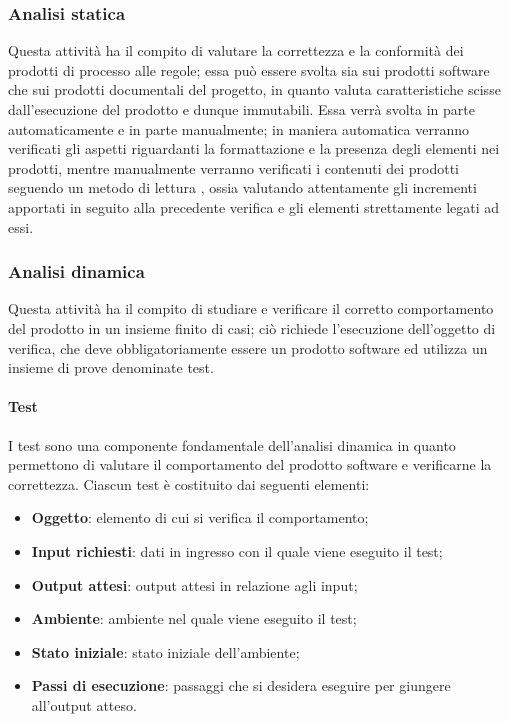 \subsubsection{Analisi statica}
\label{ssub:verifica:analisi_statica}

Questa attività ha il compito di valutare la correttezza e la conformità dei prodotti di processo alle regole; essa può essere svolta sia 
sui prodotti software che sui prodotti documentali del progetto, in quanto valuta caratteristiche scisse dall'esecuzione del prodotto e 
dunque immutabili. Essa verrà svolta in parte automaticamente e in parte manualmente; in maniera automatica verranno verificati gli 
aspetti riguardanti la formattazione e la presenza degli elementi nei prodotti, mentre manualmente verranno verificati i contenuti dei 
prodotti seguendo un metodo di lettura , ossia valutando attentamente gli incrementi apportati in seguito alla 
precedente verifica e gli elementi strettamente legati ad essi.

\subsubsection{Analisi dinamica}
\label{ssub:verifica:analisi_dinamica}

Questa attività ha il compito di studiare e verificare il corretto comportamento del prodotto in un insieme finito di casi; ciò richiede 
l'esecuzione dell'oggetto di verifica, che deve obbligatoriamente essere un prodotto software ed utilizza un insieme di prove denominate 
test.

\paragraph{Test}
\label{par:verifica:test}

I test sono una componente fondamentale dell'analisi dinamica in quanto permettono di valutare il comportamento del prodotto software e 
verificarne la correttezza.
Ciascun test è costituito dai seguenti elementi:
\begin{itemize}
    \item \textbf{Oggetto}: elemento di cui si verifica il comportamento;
    \item \textbf{Input richiesti}: dati in ingresso con il quale viene eseguito il test;
    \item \textbf{Output attesi}: output attesi in relazione agli input;
    \item \textbf{Ambiente}: ambiente nel quale viene eseguito il test;
    \item \textbf{Stato iniziale}: stato iniziale dell'ambiente;
    \item \textbf{Passi di esecuzione}: passaggi che si desidera eseguire per giungere all'output atteso.
\end{itemize}

